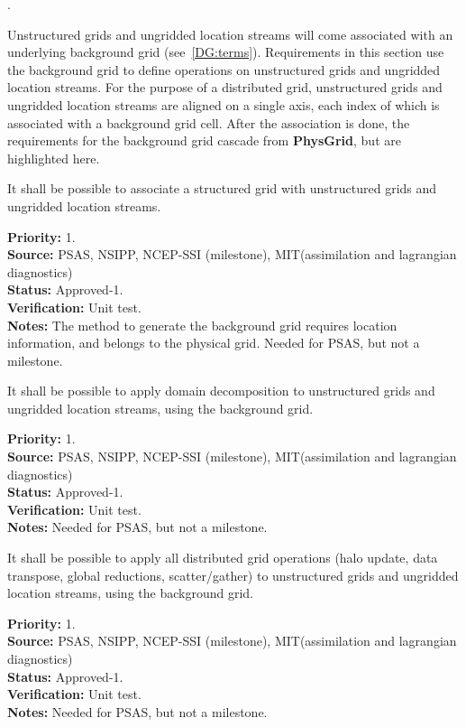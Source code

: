  \label{DG:Unstructured}.

Unstructured grids and ungridded location streams will come associated
with an underlying background grid (see~\ref{DG:terms}). Requirements
in this section use the background grid to define operations on
unstructured grids and ungridded location streams. For the purpose of
a distributed grid, unstructured grids and ungridded location streams are
aligned on a single axis, each index of which is associated with a
background grid cell. After the association is done, the requirements
for the background grid cascade from \textbf{PhysGrid}, but are
highlighted here.


It shall be possible to associate a structured grid with unstructured
grids and ungridded location streams.

\begin{reqlist}
{\bf Priority:} 1. \\ 
{\bf Source:} PSAS, NSIPP, NCEP-SSI (milestone), MIT(assimilation  and lagrangian diagnostics) \\
{\bf Status:} Approved-1. \\
{\bf Verification:} Unit test. \\
{\bf Notes:} The method to generate the background grid requires
  location information, and belongs to the physical grid.  Needed
  for PSAS, but not a milestone.
\end{reqlist}


It shall be possible to apply domain decomposition to unstructured
grids and ungridded location streams, using the background grid.

\begin{reqlist}
{\bf Priority:} 1. \\ 
{\bf Source:} PSAS, NSIPP, NCEP-SSI (milestone), MIT(assimilation  and lagrangian diagnostics) \\
{\bf Status:} Approved-1. \\ 
{\bf Verification:} Unit test. \\
{\bf Notes:}  Needed for PSAS, but not a milestone.
\end{reqlist}


It shall be possible to apply all distributed grid operations (halo update,
data transpose, global reductions, scatter/gather) to unstructured
grids and ungridded location streams, using the background grid.

\begin{reqlist}
{\bf Priority:} 1. \\ 
{\bf Source:} PSAS, NSIPP, NCEP-SSI (milestone), MIT(assimilation and lagrangian diagnostics) \\
{\bf Status:} Approved-1. \\
{\bf Verification:} Unit test. \\
{\bf Notes:} Needed for PSAS, but not a milestone.
\end{reqlist}
